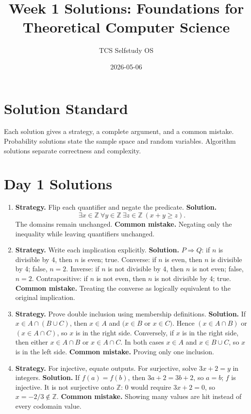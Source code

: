 \documentclass[11pt]{article}
\title{Week 1 Solutions: Foundations for Theoretical Computer Science}
\author{TCS Selfstudy OS}
\date{2026-05-06}
\begin{document}
\maketitle

\section*{Solution Standard}
Each solution gives a strategy, a complete argument, and a common mistake. Probability solutions state the sample space and random variables. Algorithm solutions separate correctness and complexity.

\section{Day 1 Solutions}
\begin{enumerate}[label=\textbf{1.\arabic*.}]
\item \textbf{Strategy.} Flip each quantifier and negate the predicate. \textbf{Solution.}
$$\exists x\in\mathbb{Z}\ \forall y\in\mathbb{Z}\ \exists z\in\mathbb{Z}\ (x+y\ge z).$$
The domains remain unchanged. \textbf{Common mistake.} Negating only the inequality while leaving quantifiers unchanged.

\item \textbf{Strategy.} Write each implication explicitly. \textbf{Solution.} $P\Rightarrow Q$: if $n$ is divisible by 4, then $n$ is even; true. Converse: if $n$ is even, then $n$ is divisible by 4; false, $n=2$. Inverse: if $n$ is not divisible by 4, then $n$ is not even; false, $n=2$. Contrapositive: if $n$ is not even, then $n$ is not divisible by 4; true. \textbf{Common mistake.} Treating the converse as logically equivalent to the original implication.

\item \textbf{Strategy.} Prove double inclusion using membership definitions. \textbf{Solution.} If $x\in A\cap(B\cup C)$, then $x\in A$ and $(x\in B$ or $x\in C)$. Hence $(x\in A\cap B)$ or $(x\in A\cap C)$, so $x$ is in the right side. Conversely, if $x$ is in the right side, then either $x\in A\cap B$ or $x\in A\cap C$. In both cases $x\in A$ and $x\in B\cup C$, so $x$ is in the left side. \textbf{Common mistake.} Proving only one inclusion.

\item \textbf{Strategy.} For injective, equate outputs. For surjective, solve $3x+2=y$ in integers. \textbf{Solution.} If $f(a)=f(b)$, then $3a+2=3b+2$, so $a=b$; $f$ is injective. It is not surjective onto $\mathbb{Z}$: $0$ would require $3x+2=0$, so $x=-2/3\notin\mathbb{Z}$. \textbf{Common mistake.} Showing many values are hit instead of every codomain value.


\end{enumerate}
\end{document}
